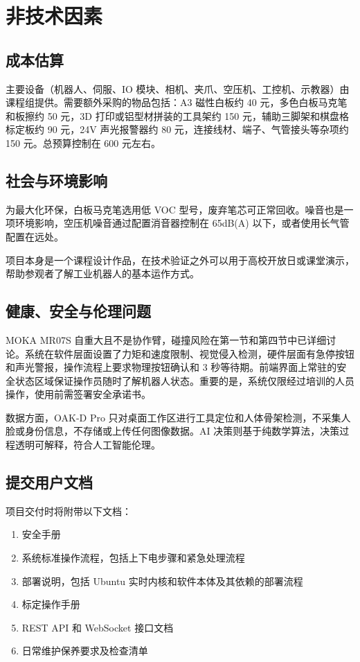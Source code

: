 \documentclass[a4paper, 12pt, oneside]{ctexart}
\begin{document}
\section{非技术因素}

\subsection{成本估算}

主要设备（机器人、伺服、IO 模块、相机、夹爪、空压机、工控机、示教器）由课程组提供。需要额外采购的物品包括：A3 磁性白板约 40 元，多色白板马克笔和板擦约 50 元，3D 打印或铝型材拼装的工具架约 150 元，辅助三脚架和棋盘格标定板约 90 元，24V 声光报警器约 80 元，连接线材、端子、气管接头等杂项约 150 元。总预算控制在 600 元左右。

\subsection{社会与环境影响}

为最大化环保，白板马克笔选用低 VOC 型号，废弃笔芯可正常回收。噪音也是一项环境影响，空压机噪音通过配置消音器控制在 65dB(A) 以下，或者使用长气管配置在远处。

项目本身是一个课程设计作品，在技术验证之外可以用于高校开放日或课堂演示，帮助参观者了解工业机器人的基本运作方式。

\subsection{健康、安全与伦理问题}

MOKA MR07S 自重大且不是协作臂，碰撞风险在第一节和第四节中已详细讨论。系统在软件层面设置了力矩和速度限制、视觉侵入检测，硬件层面有急停按钮和声光警报，操作流程上要求物理按钮确认和 3 秒等待期。前端界面上常驻的安全状态区域保证操作员随时了解机器人状态。重要的是，系统仅限经过培训的人员操作，使用前需签署安全承诺书。

数据方面，OAK-D Pro 只对桌面工作区进行工具定位和人体骨架检测，不采集人脸或身份信息，不存储或上传任何图像数据。AI 决策则基于纯数学算法，决策过程透明可解释，符合人工智能伦理。

\subsection{提交用户文档}

项目交付时将附带以下文档：
\begin{enumerate}[nosep]
    \item 安全手册
    \item 系统标准操作流程，包括上下电步骤和紧急处理流程
    \item 部署说明，包括 Ubuntu 实时内核和软件本体及其依赖的部署流程
    \item 标定操作手册
    \item REST API 和 WebSocket 接口文档
    \item 日常维护保养要求及检查清单
\end{enumerate}
\end{document}
